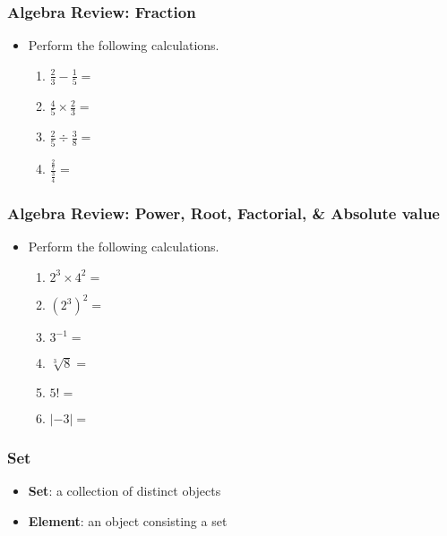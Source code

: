 \documentclass[pdflatex, 12pt]{beamer}
\begin{document}
\begin{frame}
\frametitle{Algebra Review: Fraction}
\begin{itemize}
\item Perform the following calculations.
 \begin{enumerate}
 \item $\frac{2}{3} - \frac{1}{5} = $
 \vspace{0.1cm}
 \item $\frac{4}{5} \times \frac{2}{3} = $
 \vspace{0.1cm}
 \item $\frac{2}{5} \div \frac{3}{8} = $
 \vspace{0.1cm}
 \item $\frac{\frac{2}{7}}{\frac{3}{4}} = $
 \end{enumerate}
\end{itemize}
\end{frame}

\begin{frame}
\frametitle{Algebra Review: Power, Root, Factorial, \& Absolute value}
\begin{itemize}
\item Perform the following calculations.
 \begin{enumerate}
 \item $2^3 \times 4^2 = $
 \item $(2^3)^2 = $
 \item $3^{-1} = $
 \item $\sqrt[3]{8} = $
 \item $5! = $
 \item $|-3| = $
 \end{enumerate}
\end{itemize}
\end{frame}

\begin{frame}
\frametitle{Set}
\begin{itemize}
\item \textbf{Set}: a collection of distinct objects
\vspace{0.4cm}
\item \textbf{Element}: an object consisting a set
\end{itemize}
\end{frame}
\end{document}
